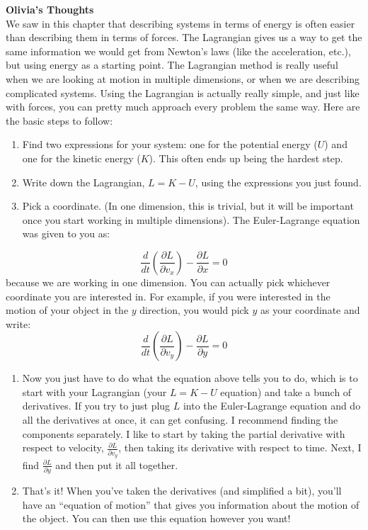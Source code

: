 \begin{framed}
\textbf{Olivia's Thoughts}\\
We saw in this chapter that describing systems in terms of energy is often easier than describing them in terms of forces. The Lagrangian gives us a way to get the same information we would get from Newton's laws (like the acceleration, etc.), but using energy as a starting point. The Lagrangian method is really useful when we are looking at motion in multiple dimensions, or when we are describing complicated systems. Using the Lagrangian is actually really simple, and just like with forces, you can pretty much approach every problem the same way. Here are the basic steps to follow:

\begin{enumerate}
\item Find two expressions for your system: one for the potential energy ($U$) and one for the kinetic energy ($K$). This often ends up being the hardest step.
\item Write down the Lagrangian, $L=K -U$, using the expressions you just found.
\item Pick a coordinate. (In one dimension, this is trivial, but it will be important once you start working in multiple dimensions). The Euler-Lagrange equation was given to you as:
\end{enumerate}
\begin{equation}
\frac{d}{dt}\left(\frac{\partial L}{\partial v_x}\right)-\frac{\partial L}{\partial x} = 0
\end{equation}
because we are working in one dimension. You can actually pick whichever coordinate you are interested in. For example, if you were interested in the motion of your object in the $y$ direction, you would pick $y$ as your coordinate and write:
\begin{equation}
\frac{d}{dt}\left(\frac{\partial L}{\partial v_y}\right)-\frac{\partial L}{\partial y} = 0
\end{equation}
\begin{enumerate}[resume]
\item Now you just have to do what the equation above tells you to do, which is to start with your Lagrangian (your $L=K -U$ equation) and take a bunch of derivatives. If you try to just plug $L$ into the Euler-Lagrange equation and do all the derivatives at once, it can get confusing. I recommend finding the components separately. I like to start by taking the partial derivative with respect to velocity, $\frac{\partial L}{\partial v_y}$, then taking its derivative with respect to time. Next, I find $\frac{\partial L}{\partial y}$ and then put it all together.
\item That's it! When you've taken the derivatives (and simplified a bit), you'll have an ``equation of motion'' that gives you information about the motion of the object. You can then use this equation however you want!
\end{enumerate}
\end{framed}

